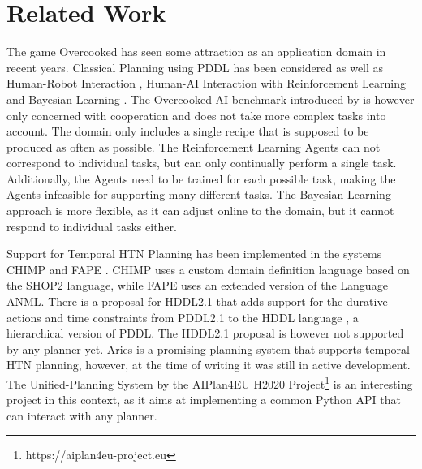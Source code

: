 \section{Related Work}

The game Overcooked has seen some attraction as an application domain in recent years.
Classical Planning using PDDL has been considered \citep{yuxinliuPlanningOvercookedGame2020} as well as Human-Robot Interaction \citep{bishopCHAOPTTestbedEvaluating2020,roseroTwoManyCooks2021}, Human-AI Interaction with Reinforcement Learning \citep{carrollUtilityLearningHumans2019,charakornInvestigatingPartnerDiversification2020,knottEvaluatingRobustnessCollaborative2021,nalepkaInteractionFlexibilityArtificial2021,fontaineImportanceEnvironmentsHumanRobot2021,zhaoMaximumEntropyPopulationbased2023,sarkarPantheonrlMarlLibrary2022,ruhdorferMindsChefsUsing2023} and Bayesian Learning \citep{ribeiroAssistingUnknownTeammates2022}.
The Overcooked AI benchmark introduced by \cite{carrollUtilityLearningHumans2019} is however only concerned with cooperation and does not take more complex tasks into account.
The domain only includes a single recipe that is supposed to be produced as often as possible.
The Reinforcement Learning Agents can not correspond to individual tasks, but can only continually perform a single task.
Additionally, the Agents need to be trained for each possible task, making the Agents infeasible for supporting many different tasks.
The Bayesian Learning approach is more flexible, as it can adjust online to the domain, but it cannot respond to individual tasks either.

Support for Temporal HTN Planning has been implemented in the systems CHIMP \citep{stockHierarchicalHybridPlanning2017} and FAPE \citep{bit-monnotFAPEConstraintbasedPlanner2020}.
CHIMP uses a custom domain definition language based on the SHOP2 language, while FAPE uses an extended version of the Language ANML.
There is a proposal for HDDL2.1 \citep{pellierHDDLDefiningFormalism2023} that adds support for the durative actions and time constraints from PDDL2.1 \citep{foxPDDL2ExtensionPDDL2003} to the HDDL language \citep{hollerHDDLExtensionPDDL2020}, a hierarchical version of PDDL.
The HDDL2.1 proposal is however not supported by any planner yet.
Aries \citep{bit-monnotAries2024} is a promising planning system that supports temporal HTN planning, however, at the time of writing it was still in active development.
The Unified-Planning System \citep{frambaUnifiedPlanning2024} by the AIPlan4EU H2020 Project\footnote{https://aiplan4eu-project.eu} is an interesting project in this context, as it aims at implementing a common Python API that can interact with any planner.


